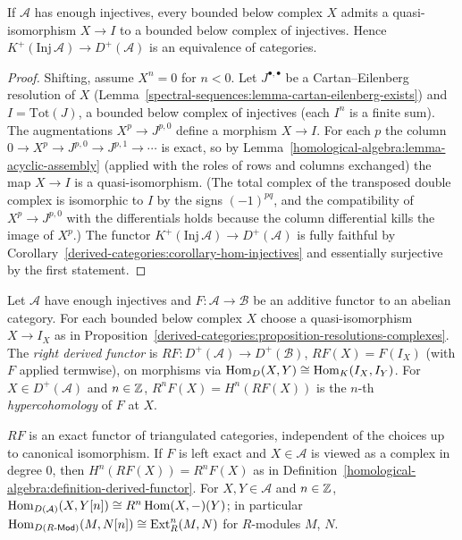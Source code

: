 \begin{proposition}\label{derived-categories:proposition-resolutions-complexes}
If $\mathcal{A}$ has enough injectives, every bounded below complex $X$ admits a quasi-isomorphism $X \to I$ to a bounded below complex of
injectives. Hence $K^+(\mathrm{Inj}\,\mathcal{A}) \to D^+(\mathcal{A})$ is an equivalence of categories.
\end{proposition}

\begin{proof}
Shifting, assume $X^n = 0$ for $n < 0$. Let $J^{\bullet,\bullet}$ be a Cartan--Eilenberg resolution of $X$
(Lemma~\ref{spectral-sequences:lemma-cartan-eilenberg-exists}) and $I = \mathrm{Tot}(J)$, a bounded below complex of injectives (each $I^n$ is a
finite sum). The augmentations $X^p \to J^{p,0}$ define a morphism $X \to I$. For each $p$ the column $0 \to X^p \to J^{p,0} \to J^{p,1} \to \cdots$ is
exact, so by Lemma~\ref{homological-algebra:lemma-acyclic-assembly} (applied with the roles of rows and columns exchanged) the map
$X \to I$ is a quasi-isomorphism. (The total complex of the transposed double complex is isomorphic to $I$ by the signs $(-1)^{pq}$, and the
compatibility of $X^p \to J^{p,0}$ with the differentials holds because the column differential kills the image of $X^p$.) The functor $K^+(\mathrm{Inj}\,\mathcal{A}) \to D^+(\mathcal{A})$ is fully faithful by
Corollary~\ref{derived-categories:corollary-hom-injectives} and essentially surjective by the first statement.
\end{proof}

\begin{definition}\label{derived-categories:definition-right-derived}
Let $\mathcal{A}$ have enough injectives and $F \colon \mathcal{A} \to \mathcal{B}$ be an additive functor to an abelian category. For each bounded
below complex $X$ choose a quasi-isomorphism $X \to I_X$ as in Proposition~\ref{derived-categories:proposition-resolutions-complexes}. The
\emph{right derived functor} is $RF \colon D^+(\mathcal{A}) \to D^+(\mathcal{B})$, $RF(X) = F(I_X)$ (with $F$ applied termwise), on morphisms via
$\operatorname{Hom}_{D}(X, Y) \cong \operatorname{Hom}_K(I_X, I_Y)$. For $X \in D^+(\mathcal{A})$ and $n \in \mathbb{Z}$, $R^nF(X) = H^n(RF(X))$ is the $n$-th \emph{hypercohomology}
of $F$ at $X$.
\end{definition}

\begin{proposition}\label{derived-categories:proposition-derived-functor-properties}
$RF$ is an exact functor of triangulated categories, independent of the choices up to canonical isomorphism. If $F$ is left exact and
$X \in \mathcal{A}$ is viewed as a complex in degree $0$, then $H^n(RF(X)) = R^nF(X)$ as in
Definition~\ref{homological-algebra:definition-derived-functor}. For $X, Y \in \mathcal{A}$ and $n \in \mathbb{Z}$,
$\operatorname{Hom}_{D(\mathcal{A})}(X, Y[n]) \cong R^n\operatorname{Hom}(X, -)(Y)$; in particular $\operatorname{Hom}_{D(R\text{-}\mathsf{Mod})}(M, N[n]) \cong \operatorname{Ext}^n_R(M, N)$ for
$R$-modules $M$, $N$.
\end{proposition}

